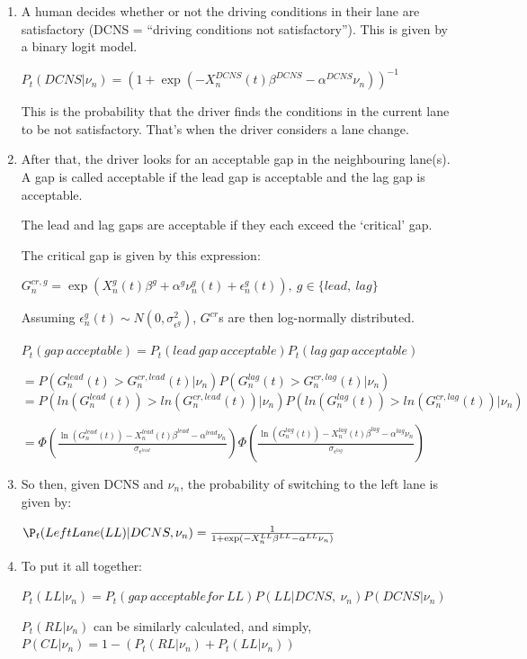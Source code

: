 \begin{enumerate}

\item

A human decides whether or not the driving conditions in their lane are satisfactory (DCNS = “driving conditions not satisfactory”). This is given by a binary logit model.

$P_t(DCNS | \nu_n) = (1 + \exp(-X_n^{DCNS}(t)\beta^{DCNS} - \alpha^{DCNS}\nu_n)) ^ {-1}$

This is the probability that the driver finds the conditions in the current lane to be not satisfactory. That’s when the driver considers a lane change. 


\item

After that, the driver looks for an acceptable gap in the neighbouring lane(s). A gap is called acceptable if the lead gap is acceptable and the lag gap is acceptable. 

The lead and lag gaps are acceptable if they each exceed the ‘critical’ gap.

The critical gap is given by this expression:

$G_n^{cr, g} = \exp(X_n^g(t)\beta^g + \alpha^g\nu_n^g(t) + \epsilon_n^g(t)), \ g \in \{lead,\ lag\}$

Assuming $\epsilon^g_n(t) \sim N(0, \sigma_{\epsilon^g}^2)$, $G^{cr}$s are then log-normally distributed.

$P_t(gap\ acceptable) = P_t(lead\ gap\ acceptable) P_t(lag\ gap\ acceptable)$

 	$ = P(G^{lead}_n(t) > G^{cr, lead}_n(t) | \nu_n) P(G^{lag}_n(t) > G^{cr, lag}_n(t) | \nu_n) $
$ = P(ln(G^{lead}_n(t)) > ln(G^{cr, lead}_n(t)) | \nu_n) P(ln(G^{lag}_n(t)) > ln(G^{cr, lag}_n(t)) | \nu_n) $

$  = \Phi\left(
   \frac{
       \ln(G^{lead}_n(t)) - X_n^{lead}(t)\beta^{lead} - \alpha^{lead}\nu_n
   }{
       \sigma_{\epsilon^{lead}}
   }
\right)
\Phi\left(
   \frac{
       \ln(G^{lag}_n(t)) - X_n^{lag}(t)\beta^{lag} - \alpha^{lag}\nu_n
   }{
       \sigma_{\epsilon^{lag}}
   }
\right)
         $

\item
So then, given DCNS and $\nu_n$, the probability of switching to the left lane is given by:

         $ \P_t(Left Lane (LL) | DCNS, \nu_n) = \frac{1}{1 + \exp(-X_n^{LL}\beta^{LL} - \alpha^{LL}\nu_n)} $

\item
To put it all together:	

            $ P_t(LL | \nu_n) = P_t(gap\ acceptable for\ LL) P(LL | DCNS,\ \nu_n) P(DCNS | \nu_n) $

        $P_t(RL | \nu_n)$ can be similarly calculated, and simply, $P(CL | \nu_n) = 1 - (P_t(RL | \nu_n) + P_t(LL | \nu_n))$

\end{enumerate}

